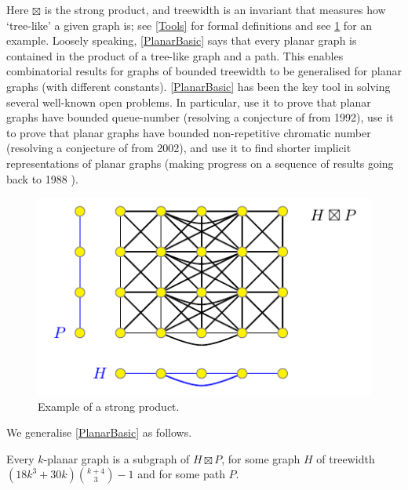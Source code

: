 \documentclass{patmorin}
\begin{document}
Here $\boxtimes$ is the strong product, and treewidth is an invariant that measures how `tree-like' a given graph is; see \cref{Tools} for formal definitions and see \cref{ProductExample} for an example. Loosely speaking, \cref{PlanarBasic} says that every planar graph is contained in the product of a tree-like graph and a path. This enables combinatorial results for graphs of bounded 
treewidth to be generalised for planar graphs (with different constants). \cref{PlanarBasic} has been the key tool in solving several well-known open problems. In particular, \citet{dujmovic.joret.ea:planar} use it to prove that planar graphs have bounded queue-number (resolving a conjecture of \citet{HLR92} from 1992), \citet{dujmovic.esperet.ea:planar} use it to prove that planar graphs have bounded non-repetitive chromatic number (resolving a conjecture of \citet{AGHR-RSA02} from 2002), and \citet{bonamy.gavoille.ea:shorter} use it to find shorter implicit representations of planar graphs (making progress on a sequence of results going back to 1988 \citep{kannan.naor.ea:implicit-stoc,kannan.naor.ea:implicit}). 

\begin{figure}[hbtp]
\begin{center}
\includegraphics{ProductExample}
\end{center}
\caption{Example of a strong product.}
\label{ProductExample}
\end{figure}

We generalise \cref{PlanarBasic} as follows. 

\begin{thm}
\label{kPlanarBasic}
Every $k$-planar graph is a subgraph of $H\boxtimes P$, for some graph $H$ of treewidth $(18k^3+30k)\binom{k+4}{3}-1$ and for some path $P$. 
\end{thm}
\end{document}
